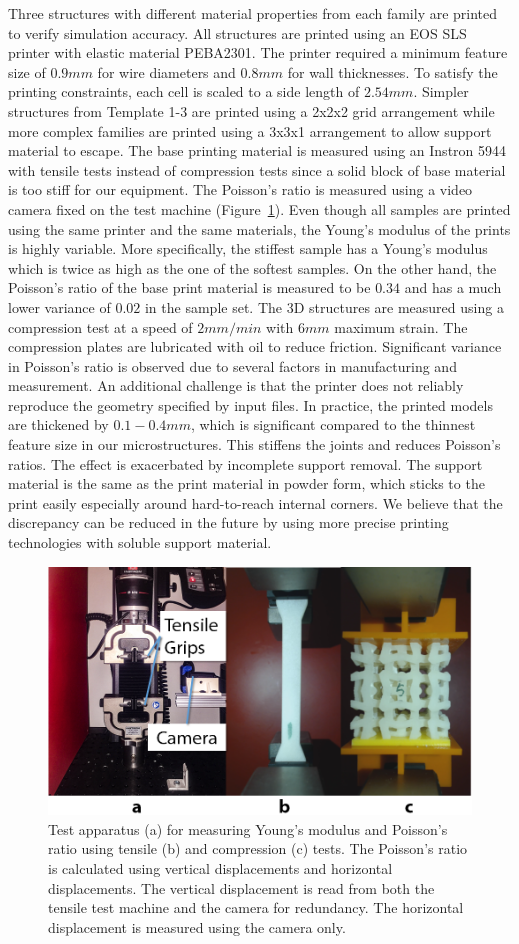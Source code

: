 Three structures with different material properties from each family are printed to verify simulation accuracy.
All structures are printed using an EOS SLS printer with elastic material PEBA2301.
The printer required a minimum feature size of $0.9mm$ for wire diameters and $0.8mm$ for wall thicknesses.
To satisfy the printing constraints, each cell is scaled to a side length of $2.54mm$.
Simpler structures from Template 1-3 are printed using a 2x2x2 grid arrangement while more complex families are printed using a 3x3x1 arrangement to allow support material to escape.
The base printing material is measured using an Instron 5944 with tensile tests instead of compression tests since a solid block of base material is too stiff for our equipment.
The Poisson’s ratio is measured using a video camera fixed on the test machine (Figure~\ref{fig:measure}).
Even though all samples are printed using the same printer and the same materials, the Young’s modulus of the prints is highly variable.
More specifically, the stiffest sample has a Young’s modulus which is twice as high as the one of the softest samples.
On the other hand, the Poisson’s ratio of the base print material is measured to be $0.34$ and has a much lower variance of $0.02$ in the sample set.
The 3D structures are measured using a compression test at a speed of $2mm/min$ with $6mm$ maximum strain.
The compression plates are lubricated with oil to reduce friction.
Significant variance in Poisson’s ratio is observed due to several factors in manufacturing and measurement.
An additional challenge is that the printer does not reliably reproduce the geometry specified by input files.
In practice, the printed models are thickened by $0.1-0.4mm$, which is significant compared to the thinnest feature size in our microstructures.
This stiffens the joints and reduces Poisson’s ratios.
The effect is exacerbated by incomplete support removal.
The support material is the same as the print material in powder form, which sticks to the print easily especially around hard-to-reach internal corners.
We believe that the discrepancy can be reduced in the future by using more precise printing technologies with soluble support material.
\begin{figure}
	\centering
	\includegraphics[width=0.5\columnwidth]{images/measure.png}
	\caption{Test apparatus (a) for measuring Young’s modulus and Poisson’s ratio using tensile (b) and compression (c) tests. The Poisson’s ratio is calculated using vertical displacements and horizontal displacements. The vertical displacement is read from both the tensile test machine and the camera for redundancy. The horizontal displacement is measured using the camera only.}
	\label{fig:measure}
\end{figure}
